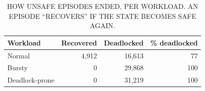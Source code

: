 \begin{table}[t]
\centering
\footnotesize
\caption{HOW UNSAFE EPISODES ENDED, PER WORKLOAD. AN EPISODE ``RECOVERS'' IF THE STATE BECOMES SAFE AGAIN.}
\label{tab:episodes}
\begin{tabular}{lrrr}
\toprule
Workload & Recovered & Deadlocked & \% deadlocked \\
\midrule
Normal & 4{,}912 & 16{,}613 & 77 \\
Bursty & 0 & 29{,}868 & 100 \\
Deadlock-prone & 0 & 31{,}219 & 100 \\
\bottomrule
\end{tabular}
\end{table}
